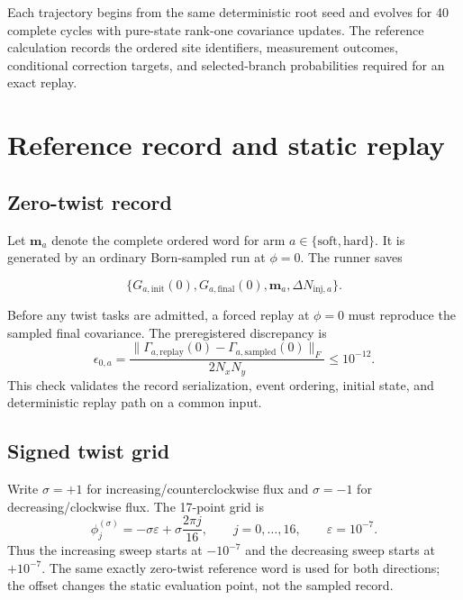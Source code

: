 \documentclass[aps,prb,twocolumn,floatfix,nofootinbib,superscriptaddress]{revtex4-2}
\begin{document}
Each trajectory begins from the same deterministic root seed and evolves for
40 complete cycles with pure-state rank-one covariance updates.  The reference
calculation records the ordered site identifiers, measurement outcomes,
conditional correction targets, and selected-branch probabilities required
for an exact replay.

\section{Reference record and static replay}

\subsection{Zero-twist record}

Let $\boldsymbol m_a$ denote the complete ordered word for arm
$a\in\{\mathrm{soft},\mathrm{hard}\}$.  It is generated by an ordinary
Born-sampled run at $\phi=0$.  The runner saves

\begin{equation}
  \bigl\{
  G_{a,\mathrm{init}}(0),
  G_{a,\mathrm{final}}(0),
  \boldsymbol m_a,
  \Delta N_{\mathrm{inj},a}
  \bigr\}.
\end{equation}

Before any twist tasks are admitted, a forced replay at $\phi=0$ must
reproduce the sampled final covariance.  The preregistered discrepancy is
\begin{equation}
  \epsilon_{0,a}
  =\frac{\lVert
  \Gamma_{a,\mathrm{replay}}(0)
  -\Gamma_{a,\mathrm{sampled}}(0)
  \rVert_F}{2N_xN_y}
  \le 10^{-12}.
  \label{eq:zero-parity}
\end{equation}
This check validates the record serialization, event ordering, initial state,
and deterministic replay path on a common input.

\subsection{Signed twist grid}

Write $\sigma=+1$ for increasing/counterclockwise flux and $\sigma=-1$ for
decreasing/clockwise flux.  The 17-point grid is
\begin{equation}
  \boxed{
  \phi_j^{(\sigma)}
  =-\sigma\varepsilon
   +\sigma\frac{2\pi j}{16}},
  \qquad
  j=0,\ldots,16,
  \qquad
  \varepsilon=10^{-7}.
  \label{eq:twist-grid}
\end{equation}
Thus the increasing sweep starts at $-10^{-7}$ and the decreasing sweep starts
at $+10^{-7}$.  The same exactly zero-twist reference word is used for both
directions; the offset changes the static evaluation point, not the sampled
record.
\end{document}
